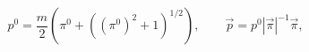 \begin{equation} 
p^0 =  \frac m 2 \left(\pi^0 + ((\pi^0)^2 + 1)^{1/2}\right), \qquad
\vec p = p^0 |\vec\pi|^{-1} \vec\pi,
\end{equation} 
